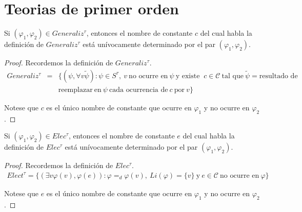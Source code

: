 \section{Teorias de primer orden}

  \begin{lemma} \label{lemma_65}
    \PN Si $(\varphi_{1}, \varphi_{2}) \in Generaliz^{\tau}$, entonces el nombre de constante $c$ del cual habla la
    definición de $Generaliz^{\tau}$ está unívocamente determinado por el par $(\varphi_{1}, \varphi_{2})$.
  \end{lemma}
  \begin{proof}
    \PN Recordemos la definición de $Generaliz^{\tau}$.
    \begin{eqnarray*}
      Generaliz^{\tau} &=& \{(\psi, \forall v \tilde{\psi}): \psi \in S^{\tau}, \ v \ \text{no ocurre en} \ \psi \
      \text{y existe } \ c \in \mathcal{C} \ \text{tal que} \ \tilde{\psi} = \text{resultado de} \\
      && \text{reemplazar} \ \text{en} \ \psi \ \text{cada ocurrencia de} \ c \ \text{por} \ v\}
    \end{eqnarray*}

    \PN Notese que $c$ es el único nombre de constante que ocurre en $\varphi_{1}$ y no ocurre en $\varphi_{2}$.
  \end{proof}

  \begin{lemma} \label{lemma_66}
    \PN Si $(\varphi_{1}, \varphi_{2}) \in Elec^{\tau}$, entonces el nombre de constante $e$ del cual habla la
    definición de $Elec^{\tau}$ está unívocamente determinado por el par $(\varphi_{1}, \varphi_{2})$.
  \end{lemma}
  \begin{proof}
    \PN Recordemos la definición de $Elec^{\tau}$.
    \begin{eqnarray*}
      Elect^{\tau} = \{(\exists v \varphi(v), \varphi(e)): \varphi =_{d} \varphi(v), \ Li(\varphi) = \{v\} \ \text{y} \
      e \in \mathcal{C} \ \text{no ocurre en} \ \varphi\}
    \end{eqnarray*}

    \PN Notese que $e$ es el único nombre de constante que ocurre en $\varphi_{1}$ y no ocurre en $\varphi_{2}$.
  \end{proof}

